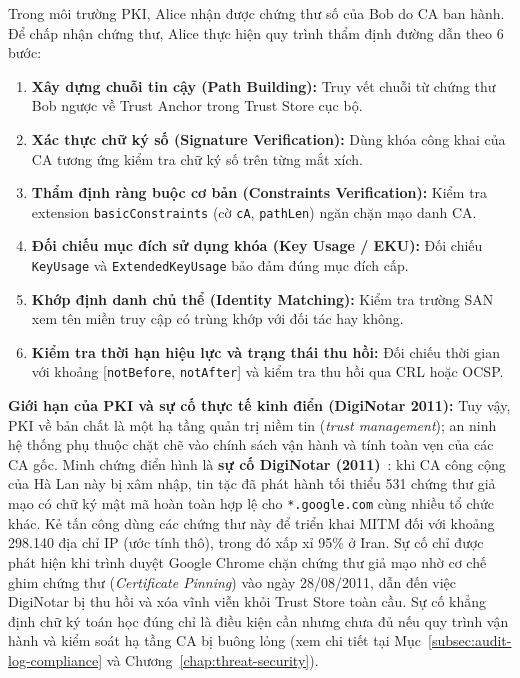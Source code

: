 Trong môi trường PKI, Alice nhận được chứng thư số của Bob do CA ban hành. Để chấp nhận chứng thư, Alice thực hiện quy trình thẩm định đường dẫn theo 6 bước:
\begin{enumerate}
    \item \textbf{Xây dựng chuỗi tin cậy (Path Building):} Truy vết chuỗi từ chứng thư Bob ngược về Trust Anchor trong Trust Store cục bộ.
    \item \textbf{Xác thực chữ ký số (Signature Verification):} Dùng khóa công khai của CA tương ứng kiểm tra chữ ký số trên từng mắt xích.
    \item \textbf{Thẩm định ràng buộc cơ bản (Constraints Verification):} Kiểm tra extension \texttt{basicConstraints} (cờ \texttt{cA}, \texttt{pathLen}) ngăn chặn mạo danh CA.
    \item \textbf{Đối chiếu mục đích sử dụng khóa (Key Usage / EKU):} Đối chiếu \texttt{KeyUsage} và \texttt{ExtendedKeyUsage} bảo đảm đúng mục đích cấp.
    \item \textbf{Khớp định danh chủ thể (Identity Matching):} Kiểm tra trường SAN xem tên miền truy cập có trùng khớp với đối tác hay không.
    \item \textbf{Kiểm tra thời hạn hiệu lực và trạng thái thu hồi:} Đối chiếu thời gian với khoảng [\texttt{notBefore}, \texttt{notAfter}] và kiểm tra thu hồi qua CRL hoặc OCSP.
\end{enumerate}

\noindent\textbf{Giới hạn của PKI và sự cố thực tế kinh điển (DigiNotar 2011):}
Tuy vậy, PKI về bản chất là một hạ tầng quản trị niềm tin (\textit{trust management}); an ninh hệ thống phụ thuộc chặt chẽ vào chính sách vận hành và tính toàn vẹn của các CA gốc. Minh chứng điển hình là \textbf{sự cố DigiNotar (2011)}~\cite{prins2011diginotar}: khi CA công cộng của Hà Lan này bị xâm nhập, tin tặc đã phát hành tối thiểu 531 chứng thư giả mạo có chữ ký mật mã hoàn toàn hợp lệ cho \texttt{*.google.com} cùng nhiều tổ chức khác. Kẻ tấn công dùng các chứng thư này để triển khai MITM đối với khoảng 298.140 địa chỉ IP (ước tính thô), trong đó xấp xỉ 95\% ở Iran. Sự cố chỉ được phát hiện khi trình duyệt Google Chrome chặn chứng thư giả mạo nhờ cơ chế ghim chứng thư (\textit{Certificate Pinning}) vào ngày 28/08/2011, dẫn đến việc DigiNotar bị thu hồi và xóa vĩnh viễn khỏi Trust Store toàn cầu. Sự cố khẳng định chữ ký toán học đúng chỉ là điều kiện cần nhưng chưa đủ nếu quy trình vận hành và kiểm soát hạ tầng CA bị buông lỏng (xem chi tiết tại Mục~\ref{subsec:audit-log-compliance} và Chương~\ref{chap:threat-security}).

